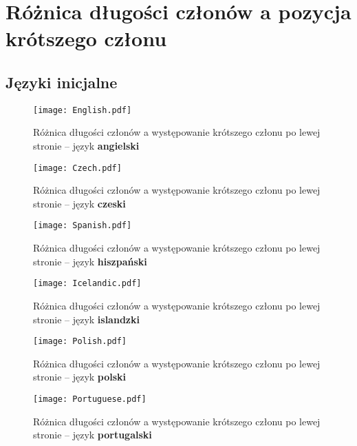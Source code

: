 \chapter{Różnica długości członów a pozycja krótszego członu} \label{dod:wykresy}
\graphicspath{{results/plots}}

\section{Języki inicjalne}

\begin{sidewaysfigure}
\centering
\texttt{[image: English.pdf]}
\caption{Różnica długości członów a występowanie krótszego członu po lewej stronie -- język \textbf{angielski}}
\label{fig:en}
\end{sidewaysfigure}

\begin{sidewaysfigure}
\centering
\texttt{[image: Czech.pdf]}
\caption{Różnica długości członów a występowanie krótszego członu po lewej stronie -- język \textbf{czeski}}
\label{fig:cz}
\end{sidewaysfigure}

\begin{sidewaysfigure}
\centering
\texttt{[image: Spanish.pdf]}
\caption{Różnica długości członów a występowanie krótszego członu po lewej stronie -- język \textbf{hiszpański}}
\label{fig:es}
\end{sidewaysfigure}

\begin{sidewaysfigure}
\centering
\texttt{[image: Icelandic.pdf]}
\caption{Różnica długości członów a występowanie krótszego członu po lewej stronie -- język \textbf{islandzki}}
\label{fig:is}
\end{sidewaysfigure}

\begin{sidewaysfigure}
\centering
\texttt{[image: Polish.pdf]}
\caption{Różnica długości członów a występowanie krótszego członu po lewej stronie -- język \textbf{polski}}
\label{fig:pl}
\end{sidewaysfigure}

\begin{sidewaysfigure}
\centering
\texttt{[image: Portuguese.pdf]}
\caption{Różnica długości członów a występowanie krótszego członu po lewej stronie -- język \textbf{portugalski}}
\label{fig:po}
\end{sidewaysfigure}

